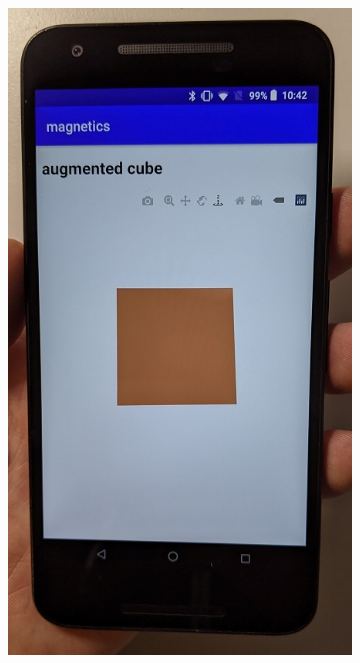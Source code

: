 \begin{figure}[hbt!]
    \centering
    \begin{subfigure}{0.3\textwidth}
        \includegraphics[height=1.5\linewidth]{figures/cube.jpg}
    \end{subfigure}
    \begin{subfigure}{0.3\textwidth}

\end{subfigure}
\end{figure}

